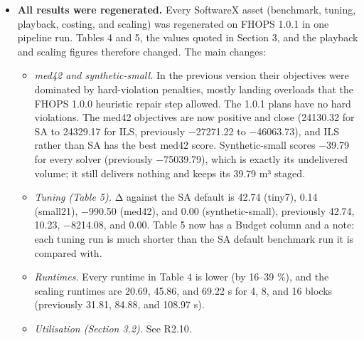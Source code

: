 \begin{itemize}
\tightlist
\item
  \textbf{All results were regenerated.} Every SoftwareX asset
  (benchmark, tuning, playback, costing, and scaling) was regenerated on
  FHOPS 1.0.1 in one pipeline run. Tables 4 and 5, the values quoted in
  Section 3, and the playback and scaling figures therefore changed. The
  main changes:

  \begin{itemize}
  \tightlist
  \item
    \emph{med42 and synthetic-small.} In the previous version their
    objectives were dominated by hard-violation penalties, mostly
    landing overloads that the FHOPS 1.0.0 heuristic repair step
    allowed. The 1.0.1 plans have no hard violations. The med42
    objectives are now positive and close (24130.32 for SA to 24329.17
    for ILS, previously −27271.22 to −46063.73), and ILS rather than SA
    has the best med42 score. Synthetic-small scores −39.79 for every
    solver (previously −75039.79), which is exactly its undelivered
    volume; it still delivers nothing and keeps its 39.79 m³ staged.
  \item
    \emph{Tuning (Table 5).} Δ against the SA default is 42.74 (tiny7),
    0.14 (small21), −990.50 (med42), and 0.00 (synthetic-small),
    previously 42.74, 10.23, −8214.08, and 0.00. Table 5 now has a
    Budget column and a note: each tuning run is much shorter than the
    SA default benchmark run it is compared with.
  \item
    \emph{Runtimes.} Every runtime in Table 4 is lower (by 16--39 \%),
    and the scaling runtimes are 20.69, 45.86, and 69.22 s for 4, 8, and
    16 blocks (previously 31.81, 84.88, and 108.97 s).
  \item
    \emph{Utilisation (Section 3.2).} See R2.10.
  \end{itemize}


\end{itemize}
